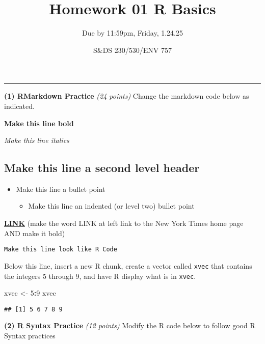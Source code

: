 \documentclass[
]{article}
\title{Homework 01 R Basics}
\subtitle{Due by 11:59pm, Friday, 1.24.25}
\author{S\&DS 230/530/ENV 757}
\date{}
\newenvironment{Shaded}{\begin{snugshade}}{\end{snugshade}}
\newcommand{\DecValTok}[1]{\textcolor[rgb]{0.00,0.00,0.81}{#1}}
\newcommand{\NormalTok}[1]{#1}
\newcommand{\OtherTok}[1]{\textcolor[rgb]{0.56,0.35,0.01}{#1}}
\newcommand{\SpecialCharTok}[1]{\textcolor[rgb]{0.81,0.36,0.00}{\textbf{#1}}}
\providecommand{\tightlist}{%
  \setlength{\itemsep}{0pt}\setlength{\parskip}{0pt}}
\begin{document}
\maketitle

\begin{center}\rule{0.5\linewidth}{0.5pt}\end{center}

\textbf{(1) RMarkdown Practice} \emph{(24 points)} Change the markdown
code below as indicated.

\textbf{Make this line bold}

\emph{Make this line italics}

\subsection{Make this line a second level
header}\label{make-this-line-a-second-level-header}

\begin{itemize}
\tightlist
\item
  Make this line a bullet point

  \begin{itemize}
  \tightlist
  \item
    Make this line an indented (or level two) bullet point
  \end{itemize}
\end{itemize}

\href{https://www.nytimes.com/}{\textbf{LINK}} (make the word LINK at
left link to the New York Times home page AND make it bold)

\texttt{Make\ this\ line\ look\ like\ R\ Code}

Below this line, insert a new R chunk, create a vector called
\texttt{xvec} that contains the integers 5 through 9, and have R display
what is in \texttt{xvec}.

\begin{Shaded}
\begin{Highlighting}[]
\NormalTok{xvec }\OtherTok{\textless{}{-}} \DecValTok{5}\SpecialCharTok{:}\DecValTok{9}
\NormalTok{xvec}
\end{Highlighting}
\end{Shaded}

\begin{verbatim}
## [1] 5 6 7 8 9
\end{verbatim}

\textbf{(2) R Syntax Practice} \emph{(12 points)} Modify the R code
below to follow good R Syntax practices
\end{document}
